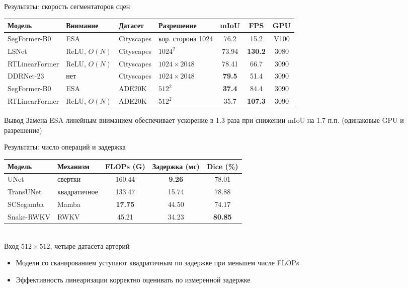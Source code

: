 \documentclass[10pt,aspectratio=169]{beamer}
\begin{document}
\begin{frame}{Результаты: скорость сегментаторов сцен}
  \centering
  \footnotesize
  \begin{tabular}{llllccc}
    \toprule
    Модель & Внимание & Датасет & Разрешение & mIoU & FPS & GPU \\
    \midrule
    SegFormer-B0 & ESA & Cityscapes & кор. сторона 1024 & 76.2 & 15.2 & V100 \\
    LSNet & ReLU, $O(N)$ & Cityscapes & $1024^2$ & 73.94 & \textbf{130.2} & 3080 \\
    RTLinearFormer & ReLU, $O(N)$ & Cityscapes & $1024 \times 2048$ & 78.41 & 66.7 & 3090 \\
    DDRNet-23 & нет & Cityscapes & $1024 \times 2048$ & \textbf{79.5} & 51.4 & 3090 \\
    \midrule
    SegFormer-B0 & ESA & ADE20K & $512^2$ & \textbf{37.4} & 84.4 & 3090 \\
    RTLinearFormer & ReLU, $O(N)$ & ADE20K & $512^2$ & 35.7 & \textbf{107.3} & 3090 \\
    \bottomrule
  \end{tabular}
  \vspace{0.5cm}
  \begin{block}{Вывод}
    Замена ESA линейным вниманием обеспечивает ускорение в 1.3 раза при снижении mIoU на 1.7 п.п. (одинаковые GPU и разрешение)
  \end{block}
\end{frame}

\begin{frame}{Результаты: число операций и задержка}
  \centering
  \footnotesize
  \begin{tabular}{llccc}
    \toprule
    Модель & Механизм & FLOPs (G) & Задержка (мс) & Dice (\%) \\
    \midrule
    UNet & свертки & 160.44 & \textbf{9.26} & 78.01 \\
    TransUNet & квадратичное & 133.47 & 15.74 & 78.88 \\
    SCSegamba & Mamba & \textbf{17.75} & 44.50 & 74.17 \\
    Snake-RWKV & RWKV & 45.21 & 34.23 & \textbf{80.85} \\
    \bottomrule
  \end{tabular}\\[2pt]
  {\scriptsize Вход $512 \times 512$, четыре датасета артерий \cite{snakerwkv}}
  \vspace{0.4cm}
  \begin{itemize}
    \item Модели со сканированием уступают квадратичным по задержке при меньшем числе FLOPs
    \item Эффективность линеаризации корректно оценивать по измеренной задержке
  \end{itemize}
\end{frame}
\end{document}
